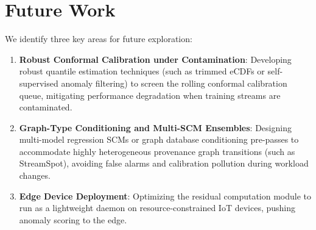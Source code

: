 \section{Future Work}
We identify three key areas for future exploration:
\begin{enumerate}
\item \textbf{Robust Conformal Calibration under Contamination}: Developing robust quantile estimation techniques (such as trimmed eCDFs or self-supervised anomaly filtering) to screen the rolling conformal calibration queue, mitigating performance degradation when training streams are contaminated.
\item \textbf{Graph-Type Conditioning and Multi-SCM Ensembles}: Designing multi-model regression SCMs or graph database conditioning pre-passes to accommodate highly heterogeneous provenance graph transitions (such as StreamSpot), avoiding false alarms and calibration pollution during workload changes.
\item \textbf{Edge Device Deployment}: Optimizing the residual computation module to run as a lightweight daemon on resource-constrained IoT devices, pushing anomaly scoring to the edge.
\end{enumerate}
